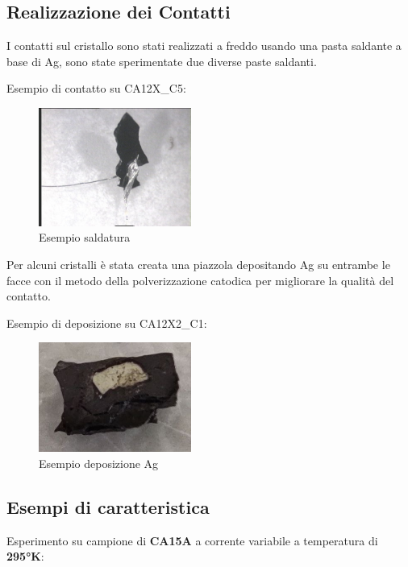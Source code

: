 \documentclass[11pt]{article}
\begin{document}
    \hypertarget{realizzazione-dei-contatti}{%
\subsection{Realizzazione dei
Contatti}\label{realizzazione-dei-contatti}}

I contatti sul cristallo sono stati realizzati a freddo usando una pasta
saldante a base di Ag, sono state sperimentate due diverse paste
saldanti.

Esempio di contatto su CA12X\_C5:

\begin{figure}
\centering
\includegraphics[width=50mm,scale=0.5]{ca12x_c5_saldatura_lato_b.jpg}
\caption{Esempio saldatura}
\end{figure}

Per alcuni cristalli è stata creata una piazzola depositando Ag su
entrambe le facce con il metodo della polverizzazione catodica per
migliorare la qualità del contatto.

Esempio di deposizione su CA12X2\_C1:

\begin{figure}
\centering
\includegraphics[width=50mm,scale=0.5]{ca12x2_c1_deposizione_argento.jpeg}
\caption{Esempio deposizione Ag}
\end{figure}

    \hypertarget{esempi-di-caratteristica}{%
\subsection{Esempi di caratteristica}\label{esempi-di-caratteristica}}

Esperimento su campione di \textbf{CA15A} a corrente variabile a
temperatura di \textbf{295°K}:
\end{document}
